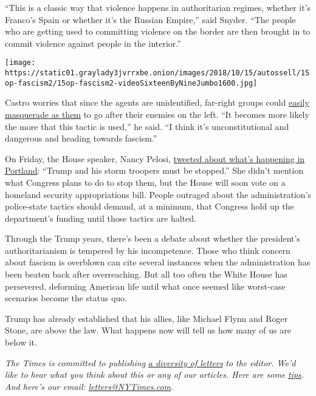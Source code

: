 ``This is a classic way that violence happens in authoritarian regimes,
whether it's Franco's Spain or whether it's the Russian Empire,'' said
Snyder. ``The people who are getting used to committing violence on the
border are then brought in to commit violence against people in the
interior.''

\texttt{[image: https://static01.graylady3jvrrxbe.onion/images/2018/10/15/autossell/15op-fascism2/15op-fascism2-videoSixteenByNineJumbo1600.jpg]}

Castro worries that since the agents are unidentified, far-right groups
could
\href{https://twitter.com/JoaquinCastrotx/status/1284956181400899585?s=20}{easily
masquerade as them} to go after their enemies on the left. ``It becomes
more likely the more that this tactic is used,'' he said. ``I think it's
unconstitutional and dangerous and heading towards fascism.''

On Friday, the House speaker, Nancy Pelosi,
\href{https://twitter.com/SpeakerPelosi/status/1284294427654197248?s=20}{tweeted
about what's happening in Portland}: ``Trump and his storm troopers must
be stopped.'' She didn't mention what Congress plans to do to stop them,
but the House will soon vote on a homeland security appropriations bill.
People outraged about the administration's police-state tactics should
demand, at a minimum, that Congress hold up the department's funding
until those tactics are halted.

Through the Trump years, there's been a debate about whether the
president's authoritarianism is tempered by his incompetence. Those who
think concern about fascism is overblown can cite several instances when
the administration has been beaten back after overreaching. But all too
often the White House has persevered, deforming American life until what
once seemed like worst-case scenarios become the status quo.

Trump has already established that his allies, like Michael Flynn and
Roger Stone, are above the law. What happens now will tell us how many
of us are below it.

\emph{The Times is committed to publishing}
\href{https://www.nytimes3xbfgragh.onion/2019/01/31/opinion/letters/letters-to-editor-new-york-times-women.html}{\emph{a
diversity of letters}} \emph{to the editor. We'd like to hear what you
think about this or any of our articles. Here are some}
\href{https://help.nytimes3xbfgragh.onion/hc/en-us/articles/115014925288-How-to-submit-a-letter-to-the-editor}{\emph{tips}}\emph{.
And here's our email:}
\href{mailto:letters@NYTimes.com}{\emph{letters@NYTimes.com}}\emph{.}

